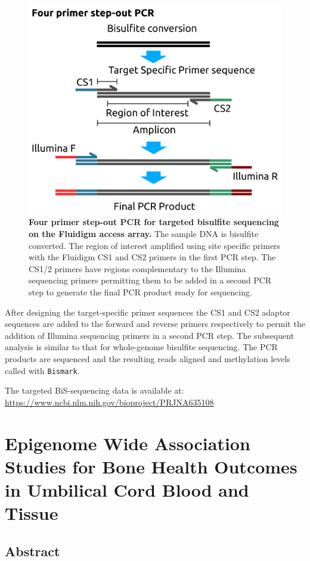 \documentclass[
]{book}
\begin{document}
\begin{figure}

{\centering \includegraphics[width=0.6\linewidth]{figs/targeted_BiSseq_fluidigm_PCR} 

}

\caption{\textbf{Four primer step-out PCR for targeted bisulfite sequencing on the Fluidigm access array.} The sample DNA is bisulfite converted. The region of interest amplified using site specific primers with the Fluidigm CS1 and CS2 primers in the first PCR step. The CS1/2 primers have regions complementary to the Illumina sequencing primers permitting them to be added in a second PCR step to generate the final PCR product ready for sequencing.}\label{fig:targetedBiSseqFluidigmPCR}
\end{figure}



After designing the target-specific primer sequences the CS1 and CS2 adaptor sequences are added to the forward and reverse primers respectively to permit the addition of Illumina sequencing primers in a second PCR step.
The subsequent analysis is similar to that for whole-genome bisulfite sequencing.
The PCR products are sequenced and the resulting reads aligned and methylation levels called with \texttt{Bismark}.

The targeted BiS-sequencing data is available at: \url{https://www.ncbi.nlm.nih.gov/bioproject/PRJNA635108}

\hypertarget{arrays}{%
\chapter{Epigenome Wide Association Studies for Bone Health Outcomes in Umbilical Cord Blood and Tissue}\label{arrays}}

\hypertarget{arrayAbstract}{%
\section{Abstract}\label{arrayAbstract}}
\end{document}
